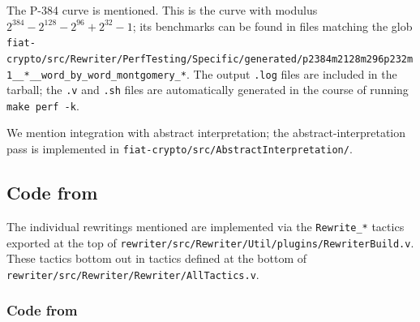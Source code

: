 \begin{subappendices}
The P-384 curve is mentioned.
This is the curve with modulus $2^{384} - 2^{128} - 2^{96} + 2^{32} - 1$; its benchmarks can be found in files matching the glob \texttt{fiat-crypto/src/Rewriter/PerfTesting/Specific/generated/p2384m2128m296p232m1\_\_*\_\_word\_by\_word\_montgomery\_*}.
The output \texttt{.log} files are included in the tarball; the \texttt{.v} and \texttt{.sh} files are automatically generated in the course of running \texttt{make perf -k}.

We mention integration with abstract interpretation; the abstract-interpretation pass is implemented in \texttt{fiat-crypto/src/AbstractInterpretation/}.

\subsection{Code from }

The individual rewritings mentioned are implemented via the \texttt{Rewrite\_*} tactics exported at the top of \texttt{rewriter/src/Rewriter/Util/plugins/RewriterBuild.v}.
These tactics bottom out in tactics defined at the bottom of \texttt{rewriter/src/Rewriter/Rewriter/AllTactics.v}.

\subsubsection{Code from } \label{sec:code:nine-steps}


\end{subappendices}
